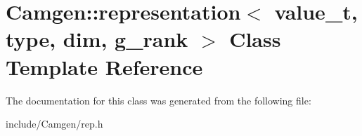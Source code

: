\hypertarget{a00463}{\section{Camgen\-:\-:representation$<$ value\-\_\-t, type, dim, g\-\_\-rank $>$ Class Template Reference}
\label{a00463}
}


The documentation for this class was generated from the following file\-:\begin{DoxyCompactItemize}
\item 
include/\-Camgen/rep.\-h\end{DoxyCompactItemize}
